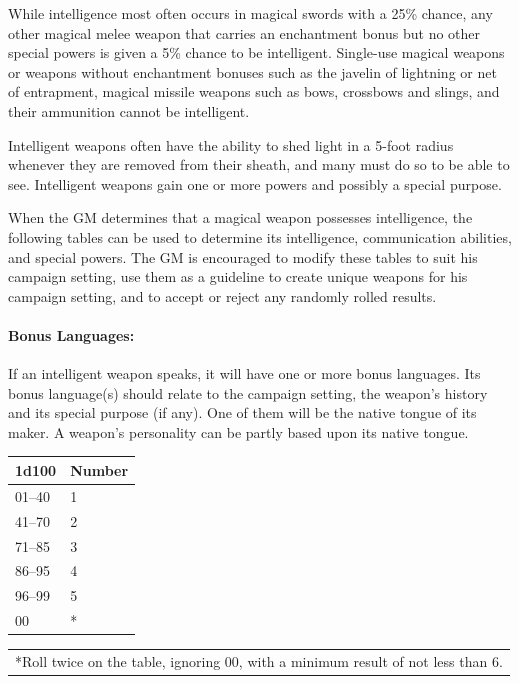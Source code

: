 \begin{multicols}{2}

While intelligence most often occurs in magical swords with a 25\% chance, any other magical melee weapon that carries an enchantment bonus but no other special powers is given a 5\% chance to be intelligent.  Single-use magical weapons or weapons without enchantment bonuses such as the javelin of lightning or net of entrapment, magical missile weapons such as bows, crossbows and slings, and their ammunition cannot be intelligent.
 
Intelligent weapons often have the ability to shed light in a 5-foot radius whenever they are removed from their sheath, and many must do so to be able to see.  Intelligent weapons gain one or more powers and possibly a special purpose.  

When the GM determines that a magical weapon possesses intelligence, the following tables can be used to determine its intelligence, communication abilities, and special powers.  The GM is encouraged to modify these tables to suit his campaign setting, use them as a guideline to create unique weapons for his campaign setting, and to accept or reject any randomly rolled results.

\paragraph{Bonus Languages:} If an intelligent weapon speaks, it will have one or more bonus languages.  Its bonus language(s) should relate to the campaign setting, the weapon's history and its special purpose (if any).  One of them will be the native tongue of its maker.  A weapon's personality can be partly based upon its native tongue.

\noindent \begin{minipage}{\columnwidth}

\label{intweapbonuslang}
\noindent \begin{tabular}{|p{}|p{}|}
\hline
1d100	& Number \\
\hline\hline
\rowcolor[gray]{0.9}01--40	& 1 \\
41--70	& 2 \\
\rowcolor[gray]{0.9}71--85	& 3 \\
86--95	& 4 \\
\rowcolor[gray]{0.9}96--99	& 5 \\
00	& * \\
\hline
\end{tabular}
\noindent\begin{tabular}{p{}}
*Roll twice on the table, ignoring 00, with a minimum result of not less than 6. \\
\end{tabular}\vspace{.5em}


\end{minipage}
\end{multicols}
